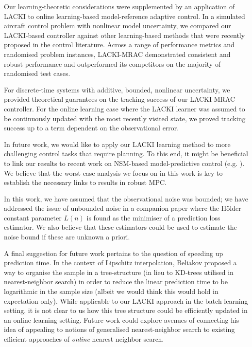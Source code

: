 Our learning-theoretic considerations were supplemented by an application of LACKI to 
online learning-based model-reference adaptive control. In a simulated aircraft control problem with nonlinear model uncertainty, we compared our LACKI-based controller against other learning-based methods that were recently proposed in the control literature. Across a range of performance metrics and randomised problem instances, LACKI-MRAC demonstrated consistent and robust performance and outperformed its competitors on the majority of randomised test cases.

For discrete-time systems with additive, bounded, nonlinear uncertainty, we provided theoretical guarantees on the tracking success of our LACKI-MRAC controller. For the online learning case where the LACKI learner was assumed to be continuously updated with the most recently visited state, we proved tracking success up to a term dependent on the observational error. 


In future work, we would like to apply our LACKI learning method to more challenging control tasks that require planning.
To this end, it might be beneficial to link our results to recent work on NSM-based model-predictive control (e.g. \cite{Canale2014}). We believe that the worst-case analysis we focus on in this work is key to establish the necessary links to results in robust MPC.

In this work, we have assumed that the observational noise was bounded; we have addressed the issue of unbounded noise in a companion paper \cite{POKIdraft2016} where the H\"older constant parameter $L(n)$ is found as the minimiser of a prediction loss estimator.  We also believe that these estimators could be used to estimate the noise bound if these are unknown a priori.

A final suggestion for future work pertains to the question of speeding up prediction time. In the context of Lipschitz interpolation, Beliakov \cite{Beliakov2006} proposed a way to organise the sample in a tree-structure (in lieu to KD-trees utilised in nearest-neighbor search) in order to reduce the linear prediction time to be logarithmic in the sample size (albeit we would think this would hold in expectation only). While applicable to our LACKI approach in the batch learning setting, it is not clear to us how this tree structure could be efficiently updated in an online learning setting. Future work could explore avenues of connecting his idea of appealing to notions of generalised nearest-neighbor search to existing efficient approaches of \emph{online} nearest neighbor search.

